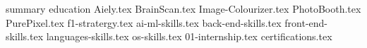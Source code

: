 \documentclass{cv_template}
\begin{document}
{summary}
{education}
{Aiely.tex}
{BrainScan.tex}
{Image-Colourizer.tex}
{PhotoBooth.tex}
{PurePixel.tex}
{f1-stratergy.tex}
{ai-ml-skills.tex}
{back-end-skills.tex}
{front-end-skills.tex}
{languages-skills.tex}
{os-skills.tex}
{01-internship.tex}
{certifications.tex}
\end{document}
